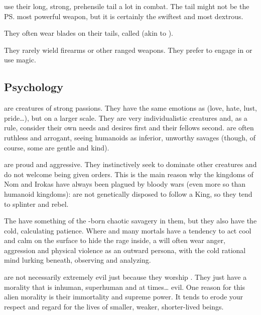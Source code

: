 \Dragons{} use their long, strong, prehensile tail a lot in combat. 
The tail might not be the \ps{\dragon} most powerful weapon, but it is certainly the swiftest and most dextrous. 

\index{\zrekklakh}
They often wear blades on their tails, called \zrekklakh{} (akin to ). 

They rarely wield firearms or other ranged weapons. 
They prefer to engage in \melee{} or use magic. 









\subsection{Psychology}
\Dragons{} are creatures of strong passions. They have the same emotions as \humans{} (love, hate, lust, pride\ldots{}), but on a larger scale. They are very individualistic creatures and, as a rule, consider their own needs and desires first and their fellows second.
\Dragons{} are often ruthless and arrogant, seeing humanoids as inferior, unworthy savages (though, of course, some \dragons{} are gentle and kind). 

\Dragons{} are proud and aggressive. They instinctively seek to dominate other creatures and do not welcome being given orders. This is the main reason why the \draconic{} kingdoms of Nom and Irokas have always been plagued by bloody wars (even more so than humanoid kingdoms): \Dragons{} are not genetically disposed to follow a King, so they tend to splinter and rebel. 

The \dragons{} have something of the \xs-born chaotic savagery in them, but they also have the cold, calculating \ophidian{} patience. 
Where \resphain{} and many mortals have a tendency to act cool and calm on the surface to hide the rage inside, a \dragon{} will often wear anger, aggression and physical violence as an outward persona, with the cold rational mind lurking beneath, observing and analyzing. 

\Dragons{} are not necessarily extremely evil just because they worship \xss. 
They just have a morality that is inhuman, superhuman and at times\ldots{} evil. 
One reason for this alien morality is their immortality and supreme power. 
It tends to erode your respect and regard for the lives of smaller, weaker, shorter-lived beings.




